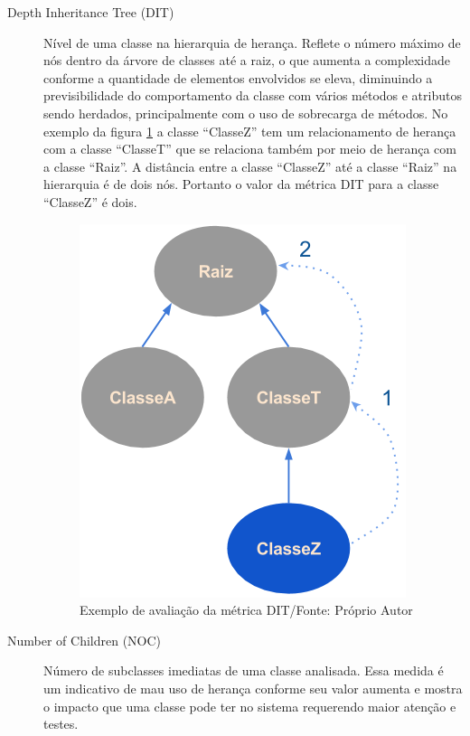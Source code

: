 \begin{description}
\item[Depth Inheritance Tree (DIT)] Nível de uma classe na
hierarquia de herança. Reflete o número máximo de nós  dentro da árvore
de classes até a raiz, o que aumenta a complexidade conforme a quantidade de
elementos envolvidos se eleva, diminuindo a previsibilidade do comportamento da
classe com vários métodos e atributos sendo herdados, principalmente com o uso
de sobrecarga de métodos. No exemplo da figura \ref{fig:pic_dit} a classe
``ClasseZ'' tem um relacionamento de herança com a classe ``ClasseT'' que se
relaciona também por meio de herança com a classe ``Raiz''. A distância entre a
classe ``ClasseZ'' até a classe ``Raiz'' na hierarquia é de dois nós. Portanto o
valor da métrica DIT para a classe ``ClasseZ'' é dois.

\begin{figure}[!ht]
	\centering
	\includegraphics[scale=0.6]{img/pic_dit.png}
	\caption{Exemplo de avaliação da métrica DIT/Fonte: Próprio Autor}
	\label{fig:pic_dit}
\end{figure}

\item[Number of Children (NOC)] Número de subclasses imediatas de uma
classe analisada. Essa medida é um indicativo de mau uso de herança conforme seu
valor aumenta e mostra o impacto que uma classe pode ter no sistema requerendo maior
atenção e testes.


\end{description}
